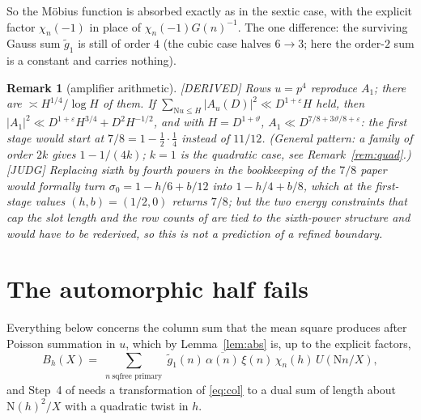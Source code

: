 \documentclass[11pt]{article}
\newtheorem{remark}[lemma]{Remark}
\newcommand{\N}{\mathrm N}
\begin{document}
So the M\"obius function is absorbed exactly as in the sextic case, with the explicit factor $\chi_n(-1)$ in place of $\chi_n(-1)G(n)^{-1}$. The one difference: the surviving Gauss sum $\tilde g_1$ is still of order $4$ (the cubic case halves $6\to3$; here the order-$2$ sum is a constant and carries nothing).

\begin{remark}[amplifier arithmetic]
[DERIVED] Rows $u=p^4$ reproduce $A_1$; there are $\asymp H^{1/4}/\log H$ of them. If $\sum_{\N u\le H}|A_u(D)|^2\ll D^{1+\varepsilon}H$ held, then $|A_1|^2\ll D^{1+\varepsilon}H^{3/4}+D^2H^{-1/2}$, and with $H=D^{1+\vartheta}$, $A_1\ll D^{7/8+3\vartheta/8+\varepsilon}$: the first stage would start at $7/8=1-\tfrac12\cdot\tfrac14$ instead of $11/12$. (General pattern: a family of order $2k$ gives $1-1/(4k)$; $k=1$ is the quadratic case, see Remark~\ref{rem:quad}.) [JUDG] Replacing sixth by fourth powers in the bookkeeping of the $7/8$ paper would formally turn $\sigma_0=1-h/6+b/12$ into $1-h/4+b/8$, which at the first-stage values $(h,b)=(1/2,0)$ returns $7/8$; but the two energy constraints that cap the slot length and the row counts of \cite{Liu26a} are tied to the sixth-power structure and would have to be rederived, so this is not a prediction of a refined boundary.
\end{remark}

\section{The automorphic half fails}
Everything below concerns the column sum that the mean square produces after Poisson summation in $u$, which by Lemma~\ref{lem:abs} is, up to the explicit factors,
\begin{equation}\label{eq:col}
B_h(X)=\sum_{\substack{n\ \text{sqfree primary}}}\tilde g_1(n)\,\overline{\alpha(n)}\,\xi(n)\,\chi_n(h)\,U(\N n/X),
\end{equation}
and Step~4 of \cite{Ope26b} needs a transformation of \eqref{eq:col} to a dual sum of length about $\N(h)^2/X$ with a quadratic twist in $h$.
\end{document}
